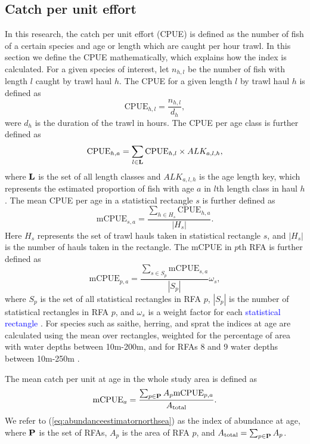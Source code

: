 \documentclass[a4paper 12pt]{article}
\numberwithin{equation}{section}
\newcommand{\nat}[1]{\textcolor{blue}{#1}}
\begin{document}
\subsection{Catch per unit effort}
\label{sec:cpueestimators}
In this research, the catch per unit effort (CPUE) is defined as the number of fish of a certain species and age or length which are caught per hour trawl. In this section we define the CPUE mathematically, which explains how the index is calculated. For a given species of interest, let $n_{h,l}$ be the number of fish with length $l$ caught by trawl haul $h$. The CPUE for a given length $l$ by trawl haul $h$ is defined as 
\begin{equation}\label{eq:cpueHaul}
\mathrm{CPUE}_{h,l} =\frac{n_{h,l}}{d_h},
\end{equation}
were $d_h$ is the duration of the trawl in hours. The CPUE per age class is further defined as
\begin{equation}\label{eq:cpueALK}
\mathrm{CPUE}_{h,a} =\sum_{l \in {\bf L}}\mathrm{CPUE}_{h, l} \times ALK_{a,l,h},
\end{equation}
where ${\bf L}$ is the set of all length classes and $ALK_{a,l,h}$ is the age length key, which represents the estimated proportion of fish with age $a$ in $l$th length class in haul $h$. The mean CPUE per age in a statistical rectangle $s$ is further defined as
\begin{equation}\label{eq:cpueRec}
\mathrm{mCPUE}_{s,a} =\frac{\sum_{h \in H_{s}} \mathrm{CPUE}_{h,a}}{|H_{s}|}.
\end{equation}
Here $H_{s}$ represents the set of trawl hauls taken in statistical rectangle $s$, and $|H_{s}|$ is the number of hauls taken in the rectangle. The mCPUE in $p$th RFA is further defined as
\begin{equation}\label{eq:cpueRFA}
\mathrm{mCPUE}_{p,a} = \frac{ \sum_{s \in S_{p}} \mathrm{mCPUE}_{s,a}}{|S_{p}|} \omega_s,
\end{equation}
where $S_{p}$ is the set of all statistical rectangles in RFA $p$, $|S_{p}|$ is the number of statistical rectangles in RFA $p$, and $\omega_s$ is a weight factor for each \nat{statistical rectangle \citep{ICES2013}}. For species such as saithe, herring, and sprat the indices at age are calculated using the mean over rectangles, weighted for the percentage of area with water depths between 10m-200m, and for RFAs 8 and 9 water depths between 10m-250m \citep{ICES2013}.

 The mean catch per unit at age in the whole study area is defined as
\begin{equation}
\text{mCPUE}_a= \frac{\sum_{p\in {\bf P}} A_{p}  \mathrm{mCPUE}_{p,a}}{A_{\text{total}}}.
\label{eq:abundanceestimatornorthsea}
\end{equation}
We refer to (\ref{eq:abundanceestimatornorthsea}) as the index of abundance at age, where ${\bf P}$ is the set of RFAs, $A_p$ is the area of RFA $p$, and $A_{\text{total}} = \sum_{p\in {\bf P}} A_{p}$.
\end{document}
